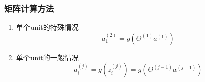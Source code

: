 \subsubsection{矩阵计算方法}
\begin{enumerate}
\item 单个unit的特殊情况
\begin{equation}
	a_1^{(2)} = g(\Theta^{(1)} a^{(1)})
\end{equation}

\item 单个unit的一般情况
\begin{equation}
	a_i^{(j)} = g(z_i^{(j)}) = g(\Theta^{(j-1)} a^{(j-1)})
\end{equation}


\end{enumerate}








